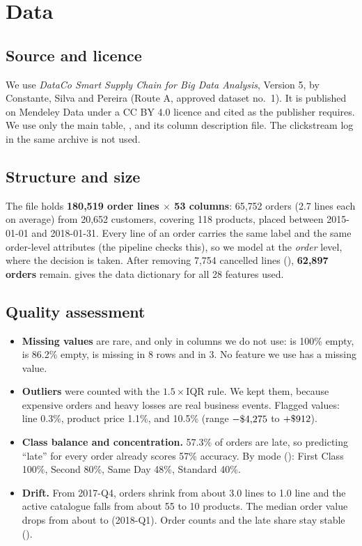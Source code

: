 \section{Data}
\label{sec:data}

\subsection{Source and licence}
We use \emph{DataCo Smart Supply Chain for Big Data Analysis}, Version 5, by Constante, Silva
and Pereira\cite{dataco2019} (Route A, approved dataset no.~1). It is published on Mendeley Data
under a CC BY 4.0 licence and cited as the publisher requires. We use only the main table,
, and its column description file. The clickstream log in the
same archive is not used.

\subsection{Structure and size}
The file holds \textbf{180{,}519 order lines $\times$ 53 columns}: 65{,}752 orders (2.7 lines
each on average) from 20{,}652 customers, covering 118 products, placed between 2015-01-01 and
2018-01-31. Every line of an order carries the same label and the same order-level attributes
(the pipeline checks this), so we model at the \emph{order} level, where the decision is taken. After removing 7{,}754 cancelled
lines (), \textbf{62{,}897 orders} remain.  gives the data
dictionary for all 28 features used.

\subsection{Quality assessment}
\begin{itemize}
  \item \textbf{Missing values} are rare, and only in columns we do not use:
         is 100\% empty,  is 86.2\% empty,
         is missing in 8 rows and  in 3. No feature
        we use has a missing value.
  \item \textbf{Outliers} were counted with the $1.5\times$IQR rule. We kept them, because
        expensive orders and heavy losses are real business events. Flagged values:
        line  0.3\%, product price 1.1\%, and  10.5\%
        (range $-\$4{,}275$ to $+\$912$).
  \item \textbf{Class balance and concentration.} 57.3\% of orders are late, so predicting
        ``late'' for every order already scores 57\% accuracy. By mode (): First
        Class 100\%, Second 80\%, Same Day 48\%, Standard 40\%.
  \item \textbf{Drift.} From 2017-Q4, orders shrink from about 3.0 lines to 1.0 line and the
        active catalogue falls from about 55 to 10 products. The median order value drops from
        about  to  (2018-Q1). Order counts and the late share stay stable
        ().
\end{itemize}

